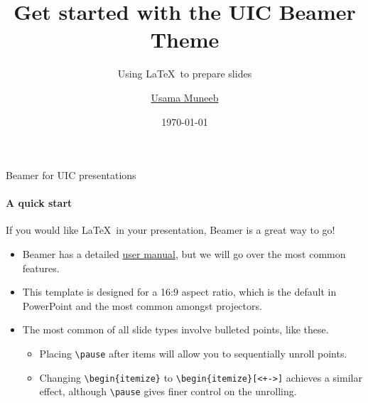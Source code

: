 \documentclass{beamer}
\title{Get started with the UIC Beamer Theme}
\subtitle{Using \LaTeX\ to prepare slides}
\author{\href{mailto:umunee2@uic.edu}{Usama Muneeb}}
\date{\today}
\newcommand{\hrefcol}[2]{\textcolor{uihteal}{\href{#1}{#2}}}
\begin{document}
\maketitle
{} %



\begin{frame}[fragile]{Beamer for UIC presentations}
\framesubtitle{A quick start}
If you would like \LaTeX\ in your presentation, Beamer is a great way to go!
\begin{itemize}
\item Beamer has a detailed
\hrefcol{https://www.ctan.org/tex-archive/macros/latex/contrib/beamer/doc/beameruserguide.pdf}{user
 manual}, but we will go over the most common features.
\item This template is designed for a 16:9 aspect ratio, which is the default in PowerPoint and the most common amongst projectors.
\item The most common of all slide types involve bulleted points, like these. \pause
\begin{itemize}
\item Placing \verb|\pause| after items will allow you to sequentially unroll points.
\item Changing \verb|\begin{itemize}| to \verb|\begin{itemize}[<+->]| achieves a similar effect, although \verb|\pause| gives finer control on the unrolling.
\end{itemize}
\end{itemize}
\end{frame}


\end{document}
